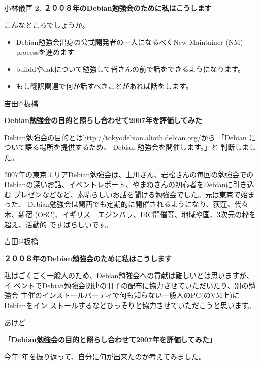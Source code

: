 \documentclass[cjk,dvipdfmx,12pt]{beamer}
\begin{document}
\begin{frame}{小林儀匡}
\textbf{2. ２００８年のDebian勉強会のために私はこうします}

こんなところでしょうか。
\begin{itemize}
 \item  Debian勉強会出身の公式開発者の一人になるべくNew Maintainer (NM) processを進めます
 \item  builddやdakについて勉強して皆さんの前で話をできるようになります。
 \item  もし翻訳関連で何か話すべきことがあれば話をします。
\end{itemize}

\end{frame}\begin{frame}{吉田@板橋}

\textbf{Debian勉強会の目的と照らし合わせて2007年を評価してみた}

Debian勉強会の目的とは\url{http://tokyodebian.alioth.debian.org/}から
「Debian について語る場所を提供するため、 Debian 勉強会を開催します。」と
判断しました。

2007年の東京エリアDebian勉強会は、上川さん、岩松さんの毎回の勉強会での
Debianの深いお話、イベントレポート、やまねさんの初心者をDebianに引き込む
プレゼンなどなど、素晴らしいお話を聞ける勉強会でした。元は東京で始まった、
Debian勉強会は関西でも定期的に開催されるようになり、荻窪、代々木、新宿
(OSC)、イギリス　エジンバラ、IRC開催等、地域や国、3次元の枠を超え、活動的
ですばらしいです。

\end{frame}\begin{frame}{吉田@板橋}

\textbf{２００８年のDebian勉強会のために私はこうします}

私はごくごく一般人のため、Debian勉強会への貢献は難しいとは思いますが、イ
ベントでDebian勉強会関連の冊子の配布に協力させていただいたり、別の勉強会
主催のインストールパーティで何も知らない一般人のPC(のVM上)にDebianをイン
ストールするなどひっそりと協力させていただこうと思います。

\end{frame}\begin{frame}{あけど}


\textbf{「Debian勉強会の目的と照らし合わせて2007年を評価してみた」}

今年1年を振り返って、自分に何が出来たのか考えてみました。


\end{frame}
\end{document}
